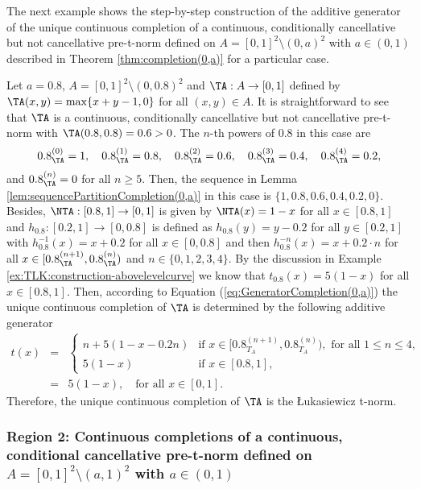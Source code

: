 The next example shows the step-by-step construction of the additive generator of the unique continuous completion of a continuous, conditionally cancellative but not cancellative pre-t-norm defined on $A=[0,1]^2 \setminus (0,a)^2$ with $a \in (0,1)$ described in Theorem \ref{thm:completion(0,a)} for a particular case.

\begin{example}\label{example:(0,a)}
	Let $a=0.8$, $A=[0,1]^2 \setminus (0,0.8)^2$ and $\TA: A \to [0,1]$ defined by $\TA(x,y)=\max\{x+y-1,0\}$ for all $(x,y) \in A$. It is straightforward to see that $\TA$ is a continuous, conditionally cancellative but not cancellative pre-t-norm with $\TA(0.8,0.8)=0.6>0$. The $n$-th powers of $0.8$ in this case are
	$$0.8_{\TA}^{(0)}=1, \quad 0.8_{\TA}^{(1)}=0.8, \quad 0.8_{\TA}^{(2)}=0.6, \quad 0.8_{\TA}^{(3)}=0.4, \quad 0.8_{\TA}^{(4)}=0.2,$$
	and $ 0.8_{\TA}^{(n)}=0$ for all $n \geq 5$. Then, the sequence in Lemma \ref{lem:sequencePartitionCompletion(0,a)} in this case is \linebreak $\{1,0.8,0.6,0.4,0.2,0\}$. Besides, $\NTA:[0.8,1] \to [0,1]$ is given by $\NTA(x)=1-x$ for all $x \in [0.8,1]$ and $h_{0.8}:[0.2,1] \to [0,0.8]$ is defined as $h_{0.8}(y)=y-0.2$ for all $y \in [0.2,1]$ with $h_{0.8}^{-1}(x)=x+0.2$ for all $x \in [0,0.8]$ and then $h_{0.8}^{-n}(x)=x+0.2 \cdot n$ for all $x \in [ 0.8_{\TA}^{(n+1)}, 0.8_{\TA}^{(n)})$ and $n \in \{0,1,2,3,4\}$. By the discussion in Example \ref{ex:TLK:construction-abovelevelcurve} we know that $t_{0.8}(x)=5(1-x)$ for all $x \in [0.8,1]$. Then, according to Equation (\ref{eq:GeneratorCompletion(0,a)}) the unique continuous completion of $\TA$ is determined by the following additive generator
	\begin{eqnarray*}
	t(x)
	&=&
	\left\{ \begin{array}{ll}
		n+5(1-x-0.2n) &   \text{if }   x \in [0.8_{T_A}^{(n+1)},0.8_{T_A}^{(n)}), \text{ for all } 1 \leq n \leq 4,\\[5pt]
		5(1-x) & \text{if } x \in [0.8,1],
	\end{array} \right. \\
	&=& 5(1-x), \quad \text{for all } x \in [0,1].
	\end{eqnarray*}
	Therefore, the unique continuous completion of $\TA$ is the Łukasiewicz t-norm.
\end{example}

\subsubsection{Region 2: Continuous completions of a continuous, conditional cancellative pre-t-norm defined on $A=[0,1]^2 \setminus (a,1)^2$ with $a \in (0,1)$}

